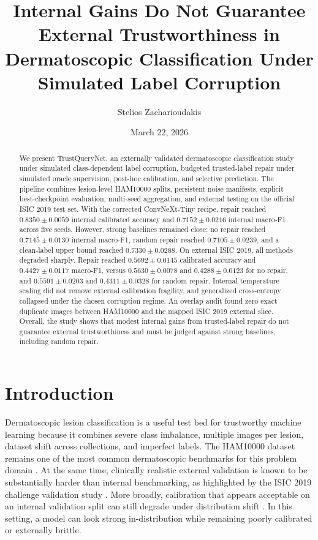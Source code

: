 \documentclass[11pt]{article}
\title{Internal Gains Do Not Guarantee External Trustworthiness in Dermatoscopic Classification Under Simulated Label Corruption}
\author{Stelios Zacharioudakis}
\date{March 22, 2026}
\begin{document}
\maketitle

\begin{abstract}
We present TrustQueryNet, an externally validated dermatoscopic classification study under simulated class-dependent label corruption, budgeted trusted-label repair under simulated oracle supervision, post-hoc calibration, and selective prediction. The pipeline combines lesion-level HAM10000 splits, persistent noise manifests, explicit best-checkpoint evaluation, multi-seed aggregation, and external testing on the official ISIC 2019 test set. With the corrected ConvNeXt-Tiny recipe, repair reached $0.8350 \pm 0.0059$ internal calibrated accuracy and $0.7152 \pm 0.0216$ internal macro-F1 across five seeds. However, strong baselines remained close: no repair reached $0.7145 \pm 0.0130$ internal macro-F1, random repair reached $0.7105 \pm 0.0239$, and a clean-label upper bound reached $0.7330 \pm 0.0288$. On external ISIC 2019, all methods degraded sharply. Repair reached $0.5692 \pm 0.0145$ calibrated accuracy and $0.4427 \pm 0.0117$ macro-F1, versus $0.5630 \pm 0.0078$ and $0.4288 \pm 0.0123$ for no repair, and $0.5591 \pm 0.0203$ and $0.4311 \pm 0.0328$ for random repair. Internal temperature scaling did not remove external calibration fragility, and generalized cross-entropy collapsed under the chosen corruption regime. An overlap audit found zero exact duplicate images between HAM10000 and the mapped ISIC 2019 external slice. Overall, the study shows that modest internal gains from trusted-label repair do not guarantee external trustworthiness and must be judged against strong baselines, including random repair.
\end{abstract}

\section{Introduction}

Dermatoscopic lesion classification is a useful test bed for trustworthy machine learning because it combines severe class imbalance, multiple images per lesion, dataset shift across collections, and imperfect labels. The HAM10000 dataset remains one of the most common dermatoscopic benchmarks for this problem domain \citep{tschandl2018ham10000}. At the same time, clinically realistic external validation is known to be substantially harder than internal benchmarking, as highlighted by the ISIC 2019 challenge validation study \citep{combalia2022isic2019}. More broadly, calibration that appears acceptable on an internal validation split can still degrade under distribution shift \citep{ovadia2019uncertainty}. In this setting, a model can look strong in-distribution while remaining poorly calibrated or externally brittle.
\end{document}
